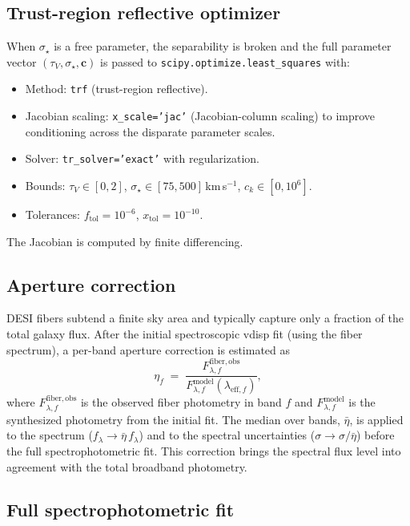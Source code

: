 \documentclass[12pt]{article}
\newcommand{\tauv}{\tau_{V}}
\newcommand{\vdisp}{\sigma_{\star}}
\newcommand{\flam}{f_\lambda}
\newcommand{\cc}{\mathbf{c}}
\begin{document}
\subsection{Trust-region reflective optimizer}
\label{ssec:trf}

When $\vdisp$ is a free parameter, the separability is broken and the full
parameter vector $(\tauv, \vdisp, \cc)$ is passed to
\texttt{scipy.optimize.least\_squares} with:
\begin{itemize}
  \item Method: \texttt{trf} (trust-region reflective).
  \item Jacobian scaling: \texttt{x\_scale='jac'} (Jacobian-column scaling)
    to improve conditioning across the disparate parameter scales.
  \item Solver: \texttt{tr\_solver='exact'} with regularization.
  \item Bounds: $\tauv \in [0,2]$, $\vdisp \in [75, 500]$\,km\,s$^{-1}$,
    $c_k \in [0, 10^6]$.
  \item Tolerances: $f_{\mathrm{tol}} = 10^{-6}$, $x_{\mathrm{tol}} = 10^{-10}$.
\end{itemize}

The Jacobian is computed by finite differencing.


\subsection{Aperture correction}
\label{ssec:apercorr}

DESI fibers subtend a finite sky area and typically capture only a fraction
of the total galaxy flux.  After the initial spectroscopic vdisp fit (using
the fiber spectrum), a per-band aperture correction is estimated as
\begin{equation}
  \eta_f \;=\; \frac{F_{\lambda,f}^{\mathrm{fiber,obs}}}
                     {F_{\lambda,f}^{\mathrm{model}}(\lambda_{\mathrm{eff},f})},
  \label{eq:apercorr}
\end{equation}
where $F_{\lambda,f}^{\mathrm{fiber,obs}}$ is the observed fiber photometry in
band $f$ and $F_{\lambda,f}^{\mathrm{model}}$ is the synthesized photometry from
the initial fit.  The median over bands, $\bar{\eta}$, is applied to the
spectrum ($\flam \to \bar{\eta}\,\flam$) and to the spectral uncertainties
($\sigma \to \sigma/\bar{\eta}$) before the full spectrophotometric fit.
This correction brings the spectral flux level into agreement with the total
broadband photometry.

\subsection{Full spectrophotometric fit}
\label{ssec:fullfit}
\end{document}
